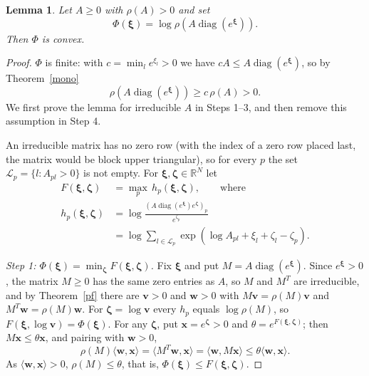 \documentclass[11pt]{article}
\theoremstyle{plain}
\newtheorem{lemma}[theorem]{Lemma}
\theoremstyle{definition}
\theoremstyle{remark}
\numberwithin{equation}{section}
\numberwithin{figure}{section}
\numberwithin{table}{section}
\begin{document}
\begin{lemma}\label{log-convex}
Let $A\ge 0$ with $\rho(A)>0$ and set
\begin{equation}\label{phi-def}
\Phi(\bm\xi)=\log\rho\left(A\operatorname{diag}\left(e^{\bm\xi}\right)\right).
\end{equation}
Then $\Phi$ is convex.
\end{lemma}
\begin{proof}
$\Phi$ is finite: with $c=\min_l e^{\xi_l}>0$ we have
$cA\le A\operatorname{diag}\left(e^{\bm\xi}\right)$, so by Theorem~\ref{mono}
\begin{equation}
\rho\left(A\operatorname{diag}\left(e^{\bm\xi}\right)\right)\ge c\,\rho(A)>0.
\end{equation}
We first prove the lemma for irreducible $A$ in Steps 1--3, and then remove
this assumption in Step 4.

An irreducible matrix has no zero row (with the index of a zero row placed
last, the matrix would be block upper triangular), so for every $p$ the set
$\mathcal{L}_p=\{l:A_{pl}>0\}$ is not empty. For $\bm\xi,\bm\zeta\in\mathbb{R}^N$
let
\begin{equation}\label{cw-F}
\begin{aligned}
F(\bm\xi,\bm\zeta)&=\max_{p}\,h_p(\bm\xi,\bm\zeta),\qquad\mbox{where}\\
h_p(\bm\xi,\bm\zeta)&=\log\frac{\left(A\operatorname{diag}\left(e^{\bm\xi}\right)e^{\bm\zeta}\right)_p}{e^{\zeta_p}}\\
&=\log\sum_{l\in\mathcal{L}_p}\exp\left(\log A_{pl}+\xi_l+\zeta_l-\zeta_p\right).
\end{aligned}
\end{equation}

\emph{Step 1: $\Phi(\bm\xi)=\min_{\bm\zeta}F(\bm\xi,\bm\zeta)$.} Fix $\bm\xi$
and put $M=A\operatorname{diag}\left(e^{\bm\xi}\right)$. Since $e^{\bm\xi}>0$,
the matrix $M\ge 0$ has the same zero entries as $A$, so $M$ and $M^T$ are
irreducible, and by Theorem~\ref{pf} there are $\bm v>0$ and $\bm w>0$ with
$M\bm v=\rho(M)\bm v$ and $M^T\bm w=\rho(M)\bm w$. For $\bm\zeta=\log\bm v$
every $h_p$ equals $\log\rho(M)$, so $F(\bm\xi,\log\bm v)=\Phi(\bm\xi)$. For
any $\bm\zeta$, put $\bm x=e^{\bm\zeta}>0$ and $\theta=e^{F(\bm\xi,\bm\zeta)}$;
then $M\bm x\le\theta\bm x$, and pairing with $\bm w>0$,
\begin{equation}
\rho(M)\langle\bm w,\bm x\rangle=\langle M^T\bm w,\bm x\rangle
=\langle\bm w,M\bm x\rangle\le\theta\langle\bm w,\bm x\rangle .
\end{equation}
As $\langle\bm w,\bm x\rangle>0$, $\rho(M)\le\theta$, that is,
$\Phi(\bm\xi)\le F(\bm\xi,\bm\zeta)$.


\end{proof}
\end{document}
